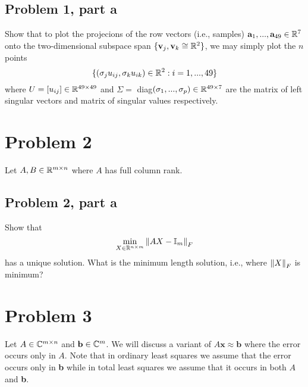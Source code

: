 \subsection{Problem 1, part a}
Show that to plot the projecions of the row vectors (i.e., samples) $\textbf{a}_1, ..., \textbf{a}_{49} \in \mathbb{R}^{7}$ onto the two-dimensional subspace span $\{ \textbf{v}_j, \textbf{v}_k \cong \mathbb{R}^2\}$, we may simply plot the $n$ points 
\[
    \{(\sigma_ju_{ij}, \sigma_ku_{ik}) \in \mathbb{R}^2 : i = 1, ..., 49\}
\]
where $U = [u_{ij}] \in \mathbb{R}^{49\times 49}$ and $\Sigma = $ diag$(\sigma_1, ..., \sigma_p) \in \mathbb{R}^{49 \times 7}$ are the matrix of left singular vectors and matrix of singular values respectively.  

\partbreak
\begin{solution}
    
\end{solution}

\newpage
\section{Problem 2}
Let $A, B \in \mathbb{R}^{m \times n}$ where $A$ has full column rank.

\subsection{Problem 2, part a}
Show that 
\[
\min_{X \in \mathbb{R}^{n\times m}} \norm{AX - \mathbb{I}_m}_F
\]
has a unique solution. What is the minimum length solution, i.e., where $\norm{X}_F$ is minimum?

\newpage
\section{Problem 3}
Let $A \in \mathbb{C}^{m\times n}$ and $\textbf{b} \in \mathbb{C}^m$. We will discuss a variant of $A\textbf{x} \approx \textbf{b}$ where the error occurs only in $A$. Note that in ordinary least squares we assume that the error occurs only in \textbf{b} while in total least squares we assume that it occurs in both $A$ and \textbf{b}.

